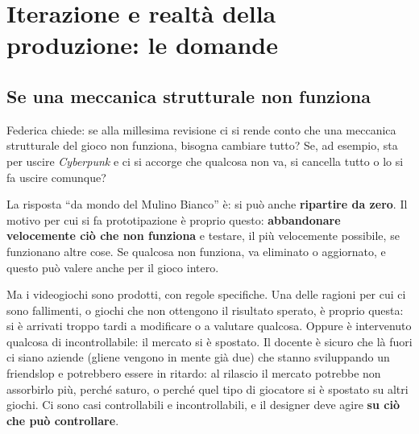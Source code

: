 \section{Iterazione e realtà della produzione: le domande}
\label{sec:domande-iterazione}

\subsection{Se una meccanica strutturale non funziona}

Federica chiede: se alla millesima revisione ci si rende conto che una
meccanica strutturale del gioco non funziona, bisogna cambiare tutto? Se, ad
esempio, sta per uscire \emph{Cyberpunk} e ci si accorge che qualcosa non va,
si cancella tutto o lo si fa uscire comunque?

La risposta ``da mondo del Mulino Bianco'' è: si può anche \textbf{ripartire
da zero}. Il motivo per cui si fa prototipazione è proprio questo:
\textbf{abbandonare velocemente ciò che non funziona} e testare, il più
velocemente possibile, se funzionano altre cose. Se qualcosa non funziona, va
eliminato o aggiornato, e questo può valere anche per il gioco intero.

Ma i videogiochi sono prodotti, con regole specifiche. Una delle ragioni per
cui ci sono fallimenti, o giochi che non ottengono il risultato sperato, è
proprio questa: si è arrivati troppo tardi a modificare o a valutare qualcosa.
Oppure è intervenuto qualcosa di incontrollabile: il mercato si è spostato. Il
docente è sicuro che là fuori ci siano aziende (gliene vengono in mente già
due) che stanno sviluppando un friendslop e potrebbero essere in ritardo:
al rilascio il mercato potrebbe non assorbirlo più, perché saturo, o perché
quel tipo di giocatore si è spostato su altri giochi. Ci sono casi
controllabili e incontrollabili, e il designer deve agire \textbf{su ciò che
può controllare}.

